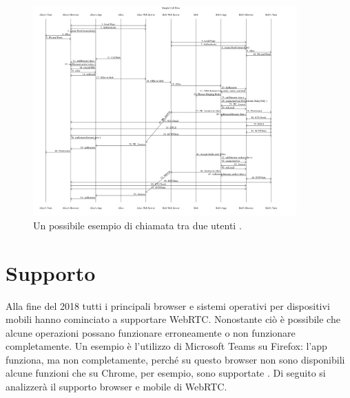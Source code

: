 \documentclass[11pt, a4paper, openany]{book}
\begin{document}
	\begin{figure}[h!]
		\centering
		\includegraphics[width=0.9\textwidth]{img/WebRTCCallFlow.png}
		\caption{Un possibile esempio di chiamata tra due utenti \cite{66}.}
	\end{figure} 	
 	\newpage
 	\section{Supporto}
 	Alla fine del 2018 tutti i principali browser e sistemi operativi per dispositivi mobili
 	hanno cominciato a supportare WebRTC. Nonostante ciò è possibile che alcune operazioni possano funzionare erroneamente o non funzionare completamente. Un esempio è l'utilizzo di Microsoft Teams su Firefox: l'app funziona, ma non completamente, perché su questo browser non sono disponibili alcune funzioni che su Chrome, per esempio, sono supportate \cite{29}.
 	Di seguito si analizzerà il supporto browser e mobile di WebRTC.
\end{document}

